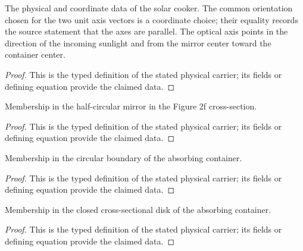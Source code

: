 \begin{definition}
  \label{def:physics:IPhO_2026_2_B_1:aux010}
  The physical and coordinate data of the solar cooker. The common orientation chosen for the two unit axis vectors is a coordinate choice; their equality records the source statement that the axes are parallel. The optical axis points in the direction of the incoming sunlight and from the mirror center toward the container center.
\end{definition}
\begin{proof}
  This is the typed definition of the stated physical carrier; its fields or defining equation provide the claimed data.
\end{proof}

\begin{definition}
  \label{def:physics:IPhO_2026_2_B_1:aux011}
  Membership in the half-circular mirror in the Figure 2f cross-section.
\end{definition}
\begin{proof}
  This is the typed definition of the stated physical carrier; its fields or defining equation provide the claimed data.
\end{proof}

\begin{definition}
  \label{def:physics:IPhO_2026_2_B_1:aux012}
  Membership in the circular boundary of the absorbing container.
\end{definition}
\begin{proof}
  This is the typed definition of the stated physical carrier; its fields or defining equation provide the claimed data.
\end{proof}

\begin{definition}
  \label{def:physics:IPhO_2026_2_B_1:aux013}
  Membership in the closed cross-sectional disk of the absorbing container.
\end{definition}
\begin{proof}
  This is the typed definition of the stated physical carrier; its fields or defining equation provide the claimed data.
\end{proof}

